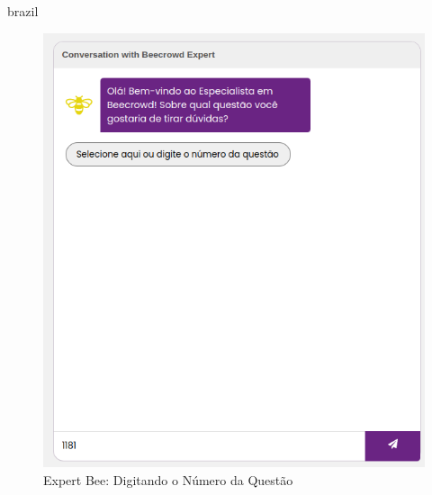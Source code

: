 \begin{otherlanguage*}{brazil}
\begin{figure}[H]
    \centering
            \caption{Expert Bee: Digitando o Número da Questão}
            \label{fig:ModeloConceitual}
        \includegraphics[scale=0.63]{pictures/desenvolvimento/expert_bee_digita_numero.png}
\end{figure}


\end{otherlanguage*}
